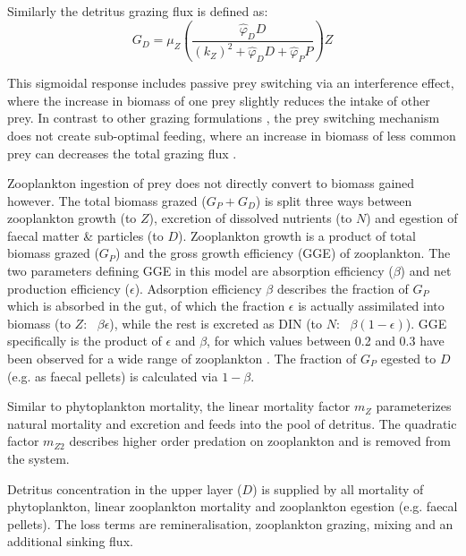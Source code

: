 \documentclass[journal abbreviation, manuscript]{copernicus}
\begin{document}
Similarly the detritus grazing flux is defined as:
\begin{equation}
    G_D = \mu_Z \left( \frac{ \hat{\varphi}_D D}{(k_Z)^2 + \hat{\varphi}_D D +\hat{\varphi}_P P}  \right) Z
\end{equation}

This sigmoidal response includes passive prey switching via an interference effect, where the increase in biomass of one prey slightly reduces the intake of other prey. In contrast to other grazing formulations \citep[e.g.,][]{Fasham1990a}, the prey switching mechanism does not create sub-optimal feeding, where an increase in biomass of less common prey can decreases the total grazing flux \citep{Gentleman2003a}.

Zooplankton ingestion of prey does not directly convert to biomass gained however. The total biomass grazed ($G_P + G_D$) is split three ways between zooplankton growth (to $Z$), excretion of dissolved nutrients (to $N$) and egestion of faecal matter \& particles (to $D$). Zooplankton growth is a product of total biomass grazed ($G_P$) and the gross growth efficiency (GGE) of zooplankton. The two parameters defining GGE in this model are absorption efficiency ($\beta$) and net production efficiency ($\epsilon$). Adsorption efficiency $\beta$ describes the fraction of $G_P$ which is absorbed in the gut, of which the fraction $\epsilon$ is actually assimilated into biomass (to $Z$: \ $\beta \epsilon$), while the rest is excreted as DIN (to $N$: \ $\beta (1-\epsilon)$). GGE specifically is the product of $\epsilon$ and $\beta$, for which values between 0.2 and 0.3 have been observed for a wide range of zooplankton \citep{Straile1997GrossGroup}. The fraction of $G_P$ egested to $D$ (e.g. as faecal pellets) is calculated via $1-\beta$. 

Similar to phytoplankton mortality, the linear mortality factor $m_Z$ parameterizes natural mortality and excretion and feeds into the pool of detritus. The quadratic factor $m_{Z2}$ describes higher order predation on zooplankton and is removed from the system. 

Detritus concentration in the upper layer ($D$) is supplied by all mortality of phytoplankton, linear zooplankton mortality and zooplankton egestion (e.g. faecal pellets). The loss terms are remineralisation, zooplankton grazing, mixing and an additional sinking flux. 
\end{document}
